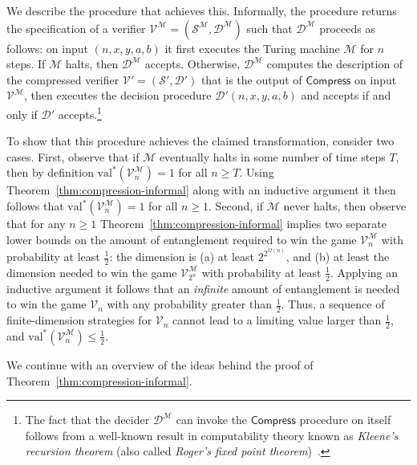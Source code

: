 \documentclass[11pt]{article}
\theoremstyle{definition}
\newcommand{\val}{\ensuremath{\mathrm{val}}}
\newcommand{\sampler}{\mathcal{S}}
\newcommand{\decider}{\mathcal{D}}
\newcommand{\verifier}{\mathcal{V}}
\newcommand{\machine}{\cal{M}}
\renewcommand{\cal}[1]{\mathcal{#1}}
\newcommand{\tmstyle}[1]{\ensuremath{\mathsf{#1}}}
\newcommand{\Compress}{\tmstyle{Compress}}
\begin{document}
We describe the procedure that achieves this. Informally, the procedure returns the specification of a verifier $\verifier^{\cal{M}} = (\sampler^\machine,\decider^\machine)$ such that $\decider^\machine$ proceeds as follows: on input $(n,x,y,a,b)$ it first executes the Turing machine $\cal{M}$ for $n$ steps. If $\cal{M}$ halts, then $\decider^\machine$ accepts. Otherwise, $\decider^\machine$ computes the description of the compressed verifier $\verifier' = (\sampler',\decider')$ that is the output of $\Compress$ on input $\verifier^\machine$, then executes the decision procedure $\decider'(n,x,y,a,b)$ and accepts if and only if $\decider'$ accepts.\footnote{The fact that the decider $\decider^\machine$ can invoke the $\Compress$ procedure on itself follows from a well-known result in computability theory known as \emph{Kleene's recursion theorem} (also called \emph{Roger's fixed point theorem})~\cite{Kleene1954,Rogers1987}.} 

To show that this procedure achieves the claimed transformation, consider two cases. First, observe that if $\cal{M}$ eventually halts in some number of time steps $T$, then by definition $\val^*(\verifier^\machine_n) = 1$ for all $n\geq T$. Using Theorem~\ref{thm:compression-informal} along with an inductive argument it then follows that $\val^*(\verifier^\machine_n) = 1$ for all $n \geq 1$. Second, if $\cal{M}$ never halts, then observe that for any $n\geq 1$ Theorem~\ref{thm:compression-informal} implies two separate lower bounds on the amount of entanglement required to win the game $\verifier^\machine_n$ with probability at least $\frac{1}{2}$: the dimension is (a) at least $2^{2^{\Omega(n)}}$, and (b) at least the dimension needed to win the game $\verifier^\machine_{2^n}$ with probability at least $\frac{1}{2}$. Applying an inductive argument it follows that an \emph{infinite} amount of entanglement is needed to win the game $\verifier_n$ with any probability greater than $\frac{1}{2}$. Thus, a sequence of finite-dimension strategies for $\verifier_n$ cannot lead to a limiting value larger than $\frac{1}{2}$, and $\val^*(\verifier^\machine_n) \leq \frac{1}{2}$. 

We continue with an overview of the ideas behind the proof of Theorem~\ref{thm:compression-informal}.

\newcommand{\CompressNW}{\mathsf{Compress}^{\mathsf{NW}}}
 
\end{document}
